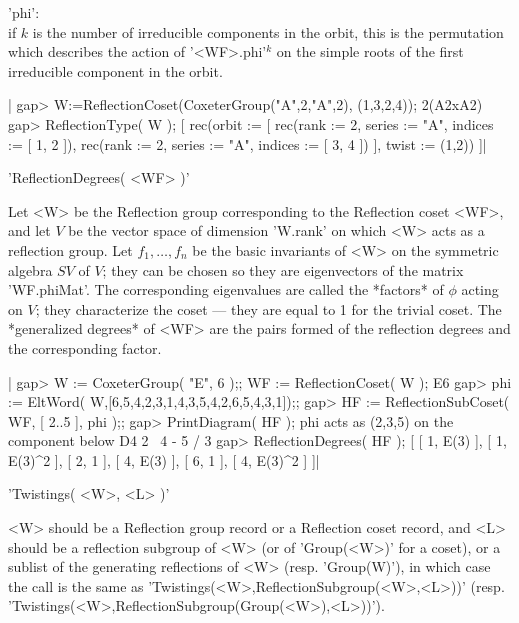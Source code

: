 'phi':\\ if $k$ is the number  of  irreducible  components  in  the  orbit,
   this  is the permutation which describes the action of '<WF>.phi'$^k$ on
   the simple roots of the first irreducible component in the orbit.

|    gap> W:=ReflectionCoset(CoxeterGroup("A",2,"A",2), (1,3,2,4));
    2(A2xA2)
    gap> ReflectionType( W );
    [ rec(orbit := [ rec(rank    := 2,
          series  := "A",
          indices := [ 1, 2 ]), rec(rank    := 2,
          series  := "A",
          indices := [ 3, 4 ]) ],
          twist := (1,2)) ]|


'ReflectionDegrees( <WF> )'

Let <W> be the Reflection group corresponding to the Reflection coset <WF>,
and  let $V$ be the vector space of dimension 'W.rank' on which <W> acts as
a  reflection group. Let $f_1,\ldots,f_n$ be the basic invariants of <W> on
the  symmetric  algebra  $SV$  of  $V$;  they  can  be  chosen  so they are
eigenvectors  of the matrix 'WF.phiMat'.  The corresponding eigenvalues are
called  the *factors* of $\phi$ acting  on $V$; they characterize the coset
--- they are equal to 1 for the trivial coset. The *generalized degrees* of
<WF>  are the pairs formed of  the reflection degrees and the corresponding
factor.

|    gap> W := CoxeterGroup( "E", 6 );; WF := ReflectionCoset( W );
    E6
    gap> phi := EltWord( W,[6,5,4,2,3,1,4,3,5,4,2,6,5,4,3,1]);;
    gap> HF := ReflectionSubCoset( WF, [ 2..5 ], phi );;
    gap> PrintDiagram( HF );
    phi acts as (2,3,5) on the component below
    D4 2
        \
         4 - 5
        /
       3
    gap> ReflectionDegrees( HF );
    [ [ 1, E(3) ], [ 1, E(3)^2 ], [ 2, 1 ], [ 4, E(3) ], [ 6, 1 ],
      [ 4, E(3)^2 ] ]|

\Section{Twistings}

'Twistings( <W>, <L> )'

<W>  should be a Reflection group record  or a Reflection coset record, and
<L> should be a reflection subgroup of <W> (or of 'Group(<W>)' for a coset),
or  a sublist of  the generating reflections  of <W> (resp. 'Group(W)'), in
which case the call is the same as
'Twistings(<W>,ReflectionSubgroup(<W>,<L>))' (resp.
'Twistings(<W>,ReflectionSubgroup(Group(<W>),<L>))').

